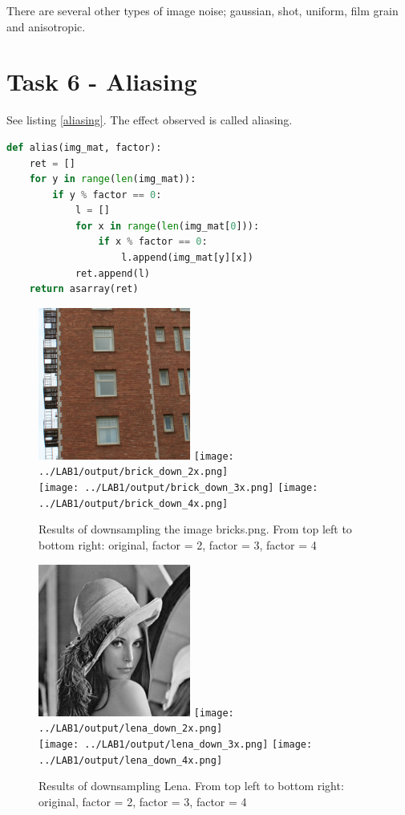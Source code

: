 There are several other types of image noise; gaussian, shot, uniform, film grain and anisotropic.

\newpage

\section*{Task 6 - Aliasing}

See listing \ref{aliasing}. The effect observed is called aliasing. 

\begin{lstlisting}[language=Python, label=aliasing, caption=Aliasing function]
def alias(img_mat, factor):
    ret = []
    for y in range(len(img_mat)):
        if y % factor == 0:
            l = []
            for x in range(len(img_mat[0])):
                if x % factor == 0:
                    l.append(img_mat[y][x])
            ret.append(l)
    return asarray(ret)
\end{lstlisting}

\begin{figure}[h!]
    \centering
    \includegraphics[width=5cm]{../LAB1/img/bricks.png}
    \texttt{[image: ../LAB1/output/brick\_down\_2x.png]} \\
    \texttt{[image: ../LAB1/output/brick\_down\_3x.png]}
    \texttt{[image: ../LAB1/output/brick\_down\_4x.png]}
    \caption{Results of downsampling the image bricks.png. From top left to bottom right: original, factor = 2, factor = 3, factor = 4}
\end{figure}


\begin{figure}[h!]
    \centering
    \includegraphics[width=5cm]{../LAB1/img/lena.png}
    \texttt{[image: ../LAB1/output/lena\_down\_2x.png]} \\
    \texttt{[image: ../LAB1/output/lena\_down\_3x.png]}
    \texttt{[image: ../LAB1/output/lena\_down\_4x.png]}
    \caption{Results of downsampling Lena. From top left to bottom right: original, factor = 2, factor = 3, factor = 4}
\end{figure}
